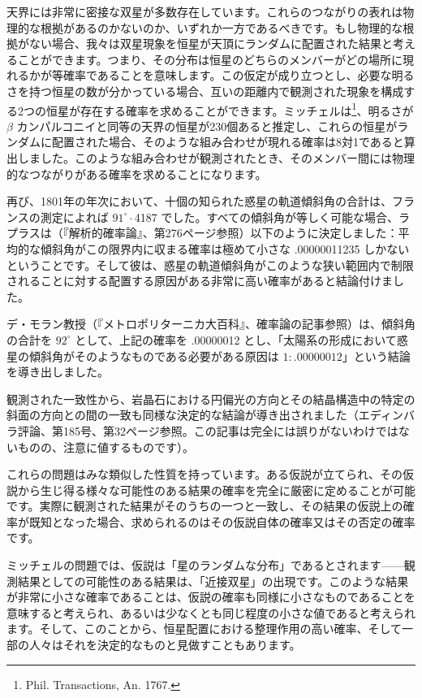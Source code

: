 \documentclass[a4paper,11pt,openany]{ltjsbook}
\begin{document}
天界には非常に密接な双星が多数存在しています。これらのつながりの表れは物理的な根拠があるのかないのか、いずれか一方であるべきです。もし物理的な根拠がない場合、我々は双星現象を恒星が天頂にランダムに配置された結果と考えることができます。つまり、その分布は恒星のどちらのメンバーがどの場所に現れるかが等確率であることを意味します。この仮定が成り立つとし、必要な明るさを持つ恒星の数が分かっている場合、互いの距離内で観測された現象を構成する2つの恒星が存在する確率を求めることができます。ミッチェルは\footnote{Phil. Transactions, An. 1767.}、明るさが$\beta$ カンパルコニイと同等の天界の恒星が230個あると推定し、これらの恒星がランダムに配置された場合、そのような組み合わせが現れる確率は8対1であると算出しました。このような組み合わせが観測されたとき、そのメンバー間には物理的なつながりがある確率を求めることになります。

再び、1801年の年次において、十個の知られた惑星の軌道傾斜角の合計は、フランスの測定によれば $91^{\circ}\cdot$4187 でした。すべての傾斜角が等しく可能な場合、ラプラスは（『解析的確率論』、第276ページ参照）以下のように決定しました：平均的な傾斜角がこの限界内に収まる確率は極めて小さな .00000011235 しかないということです。そして彼は、惑星の軌道傾斜角がこのような狭い範囲内で制限されることに対する配置する原因がある非常に高い確率があると結論付けました。

デ・モラン教授（『メトロポリターニカ大百科』、確率論の記事参照）は、傾斜角の合計を $92^{\circ}$ として、上記の確率を .00000012 とし、「太陽系の形成において惑星の傾斜角がそのようなものである必要がある原因は $1\colon .00000012$」という結論を導き出しました。

観測された一致性から、岩晶石における円偏光の方向とその結晶構造中の特定の斜面の方向との間の一致も同様な決定的な結論が導き出されました（エディンバラ評論、第185号、第32ページ参照。この記事は完全には誤りがないわけではないものの、注意に値するものです）。

これらの問題はみな類似した性質を持っています。ある仮説が立てられ、その仮説から生じ得る様々な可能性のある結果の確率を完全に厳密に定めることが可能です。実際に観測された結果がそのうちの一つと一致し、その結果の仮説上の確率が既知となった場合、求められるのはその仮説自体の確率又はその否定の確率です。

ミッチェルの問題では、仮説は「星のランダムな分布」であるとされます——観測結果としての可能性のある結果は、「近接双星」の出現です。このような結果が非常に小さな確率であることは、仮説の確率も同様に小さなものであることを意味すると考えられ、あるいは少なくとも同じ程度の小さな値であると考えられます。そして、このことから、恒星配置における整理作用の高い確率、そして一部の人々はそれを決定的なものと見做すこともあります。
\end{document}
